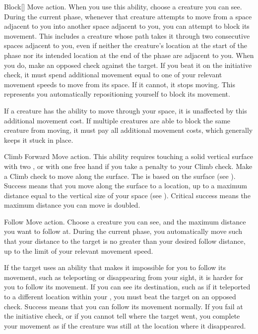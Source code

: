     \begin{activeability}{Block}[]
      \abilityusagetime Move action.
      \rankline
      When you use this ability, choose a creature you can see.
      During the current phase, whenever that creature attempts to move from a space adjacent to you into another space adjacent to you, you can attempt to block its movement.
      This includes a creature whose path takes it through two consecutive spaces adjacent to you, even if neither the creature's location at the start of the phase nor its intended location at the end of the phase are adjacent to you.
      When you do, make an opposed  check against the target.
      If you beat it on the initiative check, it must spend additional movement equal to one of your relevant movement speeds to move from its space.
      If it cannot, it stops moving.
      This represents you automatically repositioning yourself to block its movement.

      If a creature has the ability to move through your space, it is unaffected by this additional movement cost.
      If multiple creatures are able to block the same creature from moving, it must pay all additional movement costs, which generally keeps it stuck in place.
    \end{activeability}

    \begin{activeability}{Climb Forward}
      \abilityusagetime Move action.
      \rankline
      This ability requires touching a solid vertical surface with two , or with one free hand if you take a  penalty to your Climb check.
      Make a Climb check to move along the surface.
      The  is based on the surface (see ).
      Success means that you move along the surface to a location, up to a maximum distance equal to the vertical size of your space (see ).
      Critical success means the maximum distance you can move is doubled.
    \end{activeability}

    \begin{activeability}{Follow}
      \abilityusagetime Move action.
      \rankline
      Choose a creature you can see, and the maximum distance you want to follow at.
      During the current phase, you automatically move such that your distance to the target is no greater than your desired follow distance, up to the limit of your relevant movement speed.

      If the target uses an ability that makes it impossible for you to follow its movement, such as teleporting or disappearing from your sight, it is harder for you to follow its movement.
      If you can see its destination, such as if it teleported to a different location within your , you must beat the target on an opposed  check.
      Success means that you can follow its movement normally.
      If you fail at the initiative check, or if you cannot tell where the target went, you complete your movement as if the creature was still at the location where it disappeared.
    \end{activeability}

